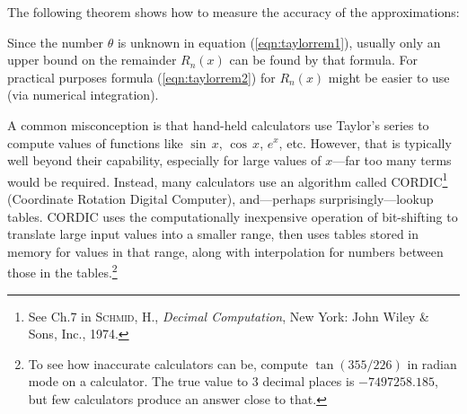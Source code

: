 The following theorem shows how to measure the accuracy of the
approximations:
\newpage
{}

Since the number $\theta$ is unknown in equation (\ref{eqn:taylorrem1}),
usually only an upper bound on the remainder $R_n(x)$ can be found by that
formula. For practical purposes formula (\ref{eqn:taylorrem2}) for $R_n(x)$
might be easier to use (via numerical integration).

A common misconception is that hand-held calculators use Taylor's series to
compute values of functions like $\sin\,x$, $\cos\,x$, $e^x$, etc. However, that
is typically well beyond their capability, especially for large values of
$x$---far too
many terms would be required. Instead, many calculators use an algorithm called
CORDIC\footnote{See Ch.7 in \textsc{Schmid, H.}, \emph{Decimal Computation},
New York: John Wiley \& Sons, Inc., 1974.}
(Coordinate Rotation Digital Computer), and---perhaps
surprisingly---lookup tables. CORDIC uses the computationally
inexpensive operation of bit-shifting to translate large input values into a
smaller range, then uses tables stored in memory for values in that range, along
with interpolation for numbers between those in the tables.\footnote{To see how
inaccurate calculators can be, compute $\tan (355/226)$ in radian mode on a
calculator. The true value to 3 decimal places is $-7497258.185$, but few
calculators produce an answer close to that.}

